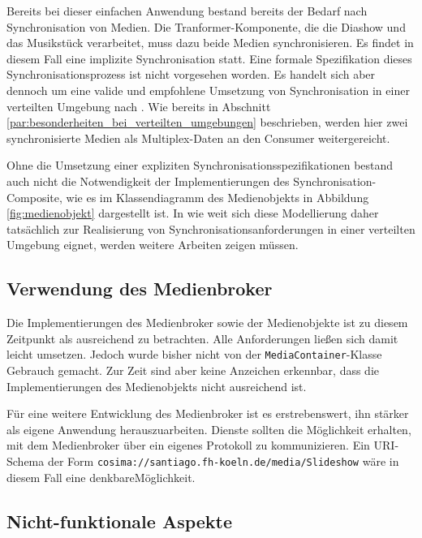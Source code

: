   Bereits bei dieser einfachen Anwendung bestand bereits der Bedarf nach Synchronisation von Medien. Die Tranformer-Komponente, die die Diashow und das Musikstück verarbeitet, muss dazu beide Medien synchronisieren. Es findet in diesem Fall eine implizite Synchronisation statt. Eine formale Spezifikation dieses Synchronisationsprozess ist nicht vorgesehen worden. Es handelt sich aber dennoch um eine valide und empfohlene Umsetzung von Synchronisation in einer verteilten Umgebung nach \citep[S. 609]{multimedia_technologie}. Wie bereits in Abschnitt \ref{par:besonderheiten_bei_verteilten_umgebungen} beschrieben, werden hier zwei synchronisierte Medien als Multiplex-Daten an den Consumer weitergereicht.
  
  Ohne die Umsetzung einer expliziten Synchronisationsspezifikationen bestand auch nicht die Notwendigkeit der Implementierungen des Synchronisation-Composite, wie es im Klassendiagramm des Medienobjekts in Abbildung \ref{fig:medienobjekt} dargestellt ist. In wie weit sich diese Modellierung daher tatsächlich zur Realisierung von Synchronisationsanforderungen in einer verteilten Umgebung eignet, werden weitere Arbeiten zeigen müssen.


\subsection{Verwendung des Medienbroker} %
\label{sub:verwendung_des_medienbroker}

  Die Implementierungen des Medienbroker sowie der Medienobjekte ist zu diesem Zeitpunkt als ausreichend zu betrachten. Alle Anforderungen ließen sich damit leicht umsetzen. Jedoch wurde bisher nicht von der \verb!MediaContainer!-Klasse Gebrauch gemacht. Zur Zeit sind aber keine Anzeichen erkennbar, dass die Implementierungen des Medienobjekts nicht ausreichend ist.
  
  Für eine weitere Entwicklung des Medienbroker ist es erstrebenswert, ihn stärker als eigene Anwendung herauszuarbeiten. Dienste sollten die Möglichkeit erhalten, mit dem Medienbroker über ein eigenes Protokoll zu kommunizieren. Ein URI-Schema der Form \verb!cosima://santiago.fh-koeln.de/media/Slideshow! wäre in diesem Fall eine denkbare\linebreak Möglichkeit.
  

\subsection{Nicht-funktionale Aspekte} %
\label{sub:nicht_funktionale_aspekte}

